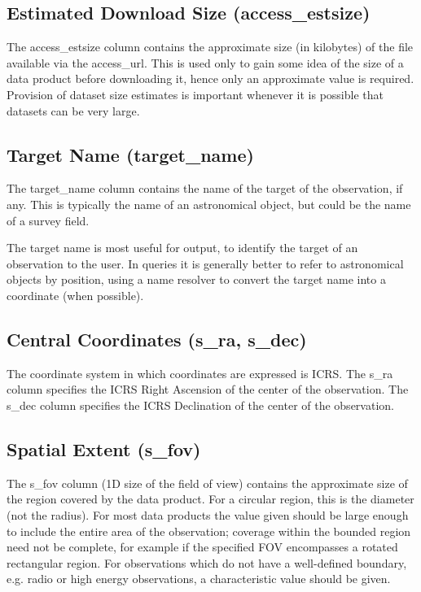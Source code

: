 \documentclass[11pt,a4paper]{ivoa}
\begin{document}
\subsection{Estimated Download Size (access\_estsize)}
The access\_estsize column contains the approximate size (in kilobytes) of the file available via the access\_url.  This
is used only to gain some idea of the size of a data product before downloading it, hence only an approximate value is
required.  Provision of dataset size estimates is important whenever it is possible that datasets can be very large. 

\subsection{Target Name (target\_name)}
The target\_name column contains the name of the target of the observation, if any.  This is typically the name of an
astronomical object, but could be the name of a survey field.

The target name is most useful for output, to identify the target of an observation to the user.  In queries it is
generally better to refer to astronomical objects by position, using a name resolver to convert the target name into a
coordinate (when possible).

\subsection{Central Coordinates (s\_ra, s\_dec)}
The coordinate system in which coordinates are expressed is ICRS. The s\_ra column specifies the ICRS Right Ascension of
the center of the observation. The s\_dec column specifies the ICRS Declination of the center of the observation.

\subsection{Spatial Extent (s\_fov)}
The s\_fov column (1D size of the field of view) contains the approximate size of the region covered by the data
product.  For a circular region, this is the diameter (not the radius).  For most data products the value given should
be large enough to include the entire area of the observation; coverage within the bounded region need not be complete,
for example if the specified FOV encompasses a rotated rectangular region.  For observations which do not have a
well-defined boundary, e.g. radio or high energy observations, a characteristic value should be given.
\end{document}
